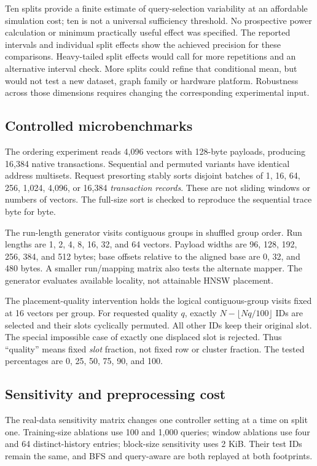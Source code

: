 \documentclass[11pt,a4paper]{report}
\newcommand{\QA}{query-aware}
\begin{document}
Ten splits provide a finite estimate of query-selection variability at an affordable simulation cost; ten is not a universal sufficiency threshold. No prospective power calculation or minimum practically useful effect was specified. The reported intervals and individual split effects show the achieved precision for these comparisons. Heavy-tailed split effects would call for more repetitions and an alternative interval check. More splits could refine that conditional mean, but would not test a new dataset, graph family or hardware platform. Robustness across those dimensions requires changing the corresponding experimental input.

\subsection{Controlled microbenchmarks}
The ordering experiment reads 4,096 vectors with 128-byte payloads, producing 16,384 native transactions. Sequential and permuted variants have identical address multisets. Request presorting stably sorts disjoint batches of 1, 16, 64, 256, 1,024, 4,096, or 16,384 \emph{transaction records}. These are not sliding windows or numbers of vectors. The full-size sort is checked to reproduce the sequential trace byte for byte.

The run-length generator visits contiguous groups in shuffled group order. Run lengths are 1, 2, 4, 8, 16, 32, and 64 vectors. Payload widths are 96, 128, 192, 256, 384, and 512 bytes; base offsets relative to the aligned base are 0, 32, and 480 bytes. A smaller run/mapping matrix also tests the alternate mapper. The generator evaluates available locality, not attainable HNSW placement.

The placement-quality intervention holds the logical contiguous-group visits fixed at 16 vectors per group. For requested quality $q$, exactly $N-\lfloor Nq/100\rfloor$ IDs are selected and their slots cyclically permuted. All other IDs keep their original slot. The special impossible case of exactly one displaced slot is rejected. Thus ``quality'' means fixed \emph{slot} fraction, not fixed row or cluster fraction. The tested percentages are 0, 25, 50, 75, 90, and 100.

\subsection{Sensitivity and preprocessing cost}
The real-data sensitivity matrix changes one controller setting at a time on split one. Training-size ablations use 100 and 1,000 queries; window ablations use four and 64 distinct-history entries; block-size sensitivity uses 2 KiB. Their test IDs remain the same, and BFS and \QA{} are both replayed at both footprints.
\end{document}
